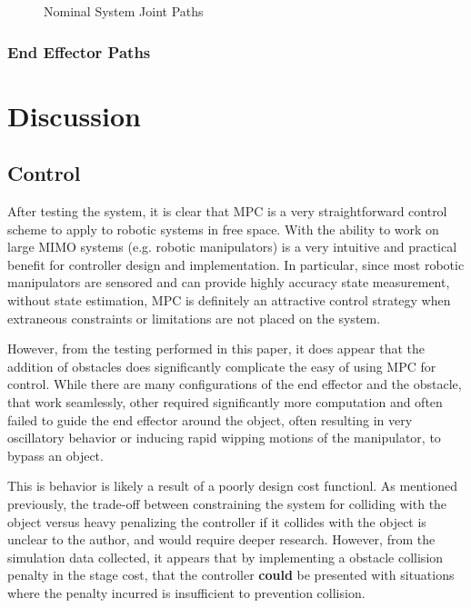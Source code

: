 \documentclass[journal]{IEEEtran}
\begin{document}
\begin{figure}%
    \centering
    \qquad
    \caption{Nominal System Joint Paths}%
    \label{fig:joint_path}%
\end{figure}

\subsubsection{End Effector Paths }

\section{Discussion}

\subsection{Control}

After testing the system, it is clear that MPC is a very straightforward control scheme to apply to robotic systems in free space. With the ability to work on large MIMO systems (e.g. robotic manipulators) is a very intuitive and practical benefit for controller design and implementation. In particular, since most robotic manipulators are sensored and can provide highly accuracy state measurement, without state estimation, MPC is definitely an attractive control strategy when extraneous constraints or limitations are not placed on the system.

However, from the testing performed in this paper, it does appear that the addition of obstacles does significantly complicate the easy of using MPC for control. While there are many configurations of the end effector and the obstacle, that work seamlessly, other required significantly more computation and often failed to guide the end effector around the object, often resulting in very oscillatory behavior or inducing rapid wipping motions of the manipulator, to bypass an object.

This is behavior is likely a result of a poorly design cost functionl. As mentioned previously, the trade-off between constraining the system for colliding with the object versus heavy penalizing the controller if it collides with the object is unclear to the author, and would require deeper research. However, from the simulation data collected, it appears that by implementing a obstacle collision penalty in the stage cost, that the controller \textbf{could} be presented with situations where the penalty incurred is insufficient to prevention collision.
\end{document}
